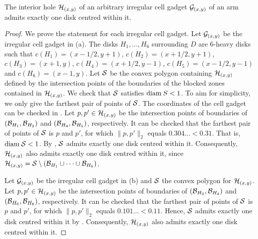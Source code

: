\begin{toappendix}
\begin{toappendix}
\begin{mlemmarep}\label{lem:irreg_holes_one_disk}
    The interior hole $\H_{(x,y)}$ of an arbitrary irregular cell gadget $\G_{(x,y)}$ of an arm admits exactly one disk centred within it.
\end{mlemmarep}
\begin{proof}
    We prove the statement for each irregular cell gadget.
    Let $\G_{(x,y)}$ be the irregular cell gadget in (a).
    The disks $H_1,\ldots,H_6$ surrounding $D$ are $6$-heavy disks such that $c(H_1) = (x-1/2,y+1)$, $c(H_2) = (x+1/2,y+1)$, $c(H_3) = (x+1,y)$, $c(H_4) = (x+1/2,y-1)$, $c(H_5) = (x-1/2,y-1)$ and $c(H_6) = (x-1,y)$.
    Let $\S$ be the convex polygon containing $\H_{(x,y)}$ defined by the intersection points of the boundaries of the blocked zones contained in $\H_{(x,y)}$.
    We check that $\S$ satisfies $\diam{S} < 1$.
    To aim for simplicity, we only give the farthest pair of points of $\S$.
    The coordinates of the cell gadget can be checked in .
    Let $p,p' \in \H_{(x,y)}$ be the intersection points of boundaries of $(\B_{H_1},\B_{H_2})$ and $(\B_{H_4},\B_{H_5})$, respectively.
    It can be checked that the farthest pair of points of $\S$ is $p$ and $p'$, for which $\lVert p,p'\rVert_2$ equals $0.304\ldots < 0.31$.
    That is, $\diam{\S} < 1$.
    By , $\S$ admits exactly one disk centred within it.
    Consequently, $\H_{(x,y)}$ also admits exactly one disk centred within it, since $\H_{(x,y)} = \S \setminus (\B_{H_1} \cup \cdots \cup \B_{H_6})$.
    
    Let $\G_{(x,y)}$ be the irregular cell gadget in (b) and $\S$ the convex polygon for $\H_{(x,y)}$.
    Let $p,p' \in \H_{(x,y)}$ be the intersection points of boundaries of $(\B_{H_2},\B_{H_4})$ and $(\B_{H_6},\B_{H_8})$, respectively.
    It can be checked that the farthest pair of points of $\S$ is $p$ and $p'$, for which $\lVert p,p'\rVert_2$ equals $0.101\ldots < 0.11$.
    Hence, $\S$ admits exactly one disk centred within it by .
    Consequently, $\H_{(x,y)}$ also admits exactly one disk centred within it.


\end{proof}
\end{toappendix}
\end{toappendix}
